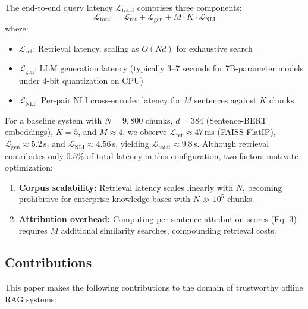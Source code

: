 \documentclass[conference]{IEEEtran}
\begin{document}
The end-to-end query latency $\mathcal{L}_{\text{total}}$ comprises three components:
\begin{equation}
\mathcal{L}_{\text{total}} = \mathcal{L}_{\text{ret}} + \mathcal{L}_{\text{gen}} + M \cdot K \cdot \mathcal{L}_{\text{NLI}}
\end{equation}
where:
\begin{itemize}
    \item $\mathcal{L}_{\text{ret}}$: Retrieval latency, scaling as $O(Nd)$ for exhaustive search
    \item $\mathcal{L}_{\text{gen}}$: LLM generation latency (typically 3--7 seconds for 7B-parameter models under 4-bit quantization on CPU)
    \item $\mathcal{L}_{\text{NLI}}$: Per-pair NLI cross-encoder latency for $M$ sentences against $K$ chunks
\end{itemize}

For a baseline system with $N=9{,}800$ chunks, $d=384$ (Sentence-BERT embeddings), $K=5$, and $M \approx 4$, we observe $\mathcal{L}_{\text{ret}} \approx 47$\,ms (FAISS FlatIP), $\mathcal{L}_{\text{gen}} \approx 5.2$\,s, and $\mathcal{L}_{\text{NLI}} \approx 4.56$\,s, yielding $\mathcal{L}_{\text{total}} \approx 9.8$\,s. Although retrieval contributes only 0.5\% of total latency in this configuration, two factors motivate optimization:

\begin{enumerate}
    \item \textbf{Corpus scalability:} Retrieval latency scales linearly with $N$, becoming prohibitive for enterprise knowledge bases with $N \gg 10^5$ chunks.
    \item \textbf{Attribution overhead:} Computing per-sentence attribution scores (Eq. 3) requires $M$ additional similarity searches, compounding retrieval costs.
\end{enumerate}

\subsection{Contributions}

This paper makes the following contributions to the domain of trustworthy offline RAG systems:
\end{document}
